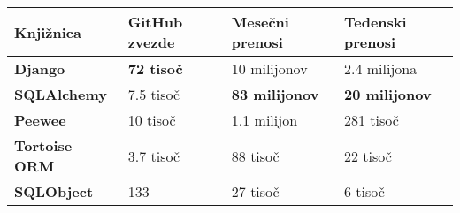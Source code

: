 \documentclass[a4paper,12pt,openright]{book}
\begin{document}
    \noindent
    \begin{center}
        \begin{tabular}{p{}|p{}|p{}|p{}}
          {\bf Knjižnica} & {\bf GitHub zvezde} & {\bf Mesečni prenosi} & {\bf Tedenski prenosi} \\ \hline
          {\bf Django \cite{DJANGO_GITHUB}} & \textbf{\num{72} tisoč} & \num{10} milijonov & \num{2,4} milijona \\
          {\bf SQLAlchemy \cite{SQLALCHEMY_GITHUB}} & \num{7,5} tisoč &  \textbf{\num{83} milijonov} & \textbf{\num{20} milijonov} \\
          {\bf Peewee \cite{PEEWEE_GITHUB}} & \num{10} tisoč & \num{1,1} milijon & \num{281} tisoč \\
          {\bf Tortoise ORM \cite{TORTOISE_GITHUB}} & \num{3,7} tisoč & \num{88} tisoč & \num{22} tisoč \\
          {\bf SQLObject \cite{SQLOBJECT_GITHUB}} & 133 & \num{27} tisoč & \num{6} tisoč \\
        \end{tabular}
    \end{center}
    
\end{document}
